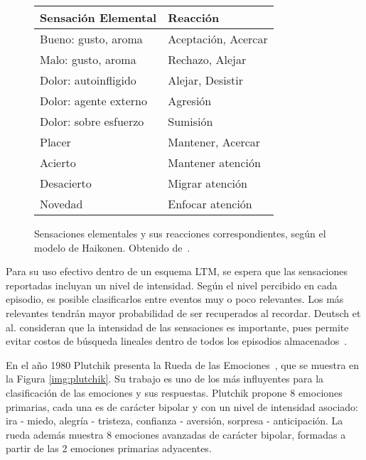 \begin{figure}[!ht]
	\centering
	\begin{tabular}{| l | l |}
		\hline
		\rowcolor{gray!50}
		Sensación Elemental & Reacción  \\ 
		\hline Bueno: gusto, aroma & Aceptación, Acercar \\ 
		\hline Malo: gusto, aroma & Rechazo, Alejar \\ 
		\hline Dolor: autoinfligido  & Alejar, Desistir \\ 
		\hline Dolor: agente externo & Agresión \\ 
		\hline Dolor: sobre esfuerzo & Sumisión \\ 
		\hline Placer & Mantener, Acercar \\ 
		\hline Acierto & Mantener atención \\ 
		\hline Desacierto & Migrar atención \\ 
		\hline Novedad & Enfocar atención \\ 
		\hline 
	\end{tabular} 
	\caption{\small Sensaciones elementales y sus reacciones correspondientes, según el modelo de Haikonen. Obtenido de~\cite{Dodd2005}.}
	\label{img:emotional_haikonen}
\end{figure}

Para su uso efectivo dentro de un esquema LTM, se espera que las sensaciones reportadas incluyan un nivel de intensidad. Según el nivel percibido en cada episodio, es posible clasificarlos entre eventos muy o poco relevantes. Los más relevantes tendrán mayor probabilidad de ser recuperados al recordar. Deutsch et al. consideran que la intensidad de las sensaciones es importante, pues permite evitar costos de búsqueda lineales dentro de todos los episodios almacenados~\cite{Deutsch2008}.

En el año 1980 Plutchik presenta la Rueda de las Emociones~\cite{plutchik1980}, que se muestra en la Figura \ref{img:plutchik}. Su trabajo es uno de los más influyentes para la clasificación de las emociones y sus respuestas. Plutchik propone 8 emociones primarias, cada una es de carácter bipolar y con un nivel de intensidad asociado: ira - miedo, alegría - tristeza, confianza - aversión, sorpresa - anticipación. La rueda además muestra 8 emociones avanzadas de carácter bipolar, formadas a partir de las 2 emociones primarias adyacentes.

